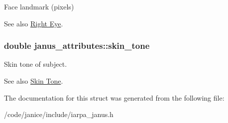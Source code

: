 Face landmark (pixels) 

\begin{DoxySeeAlso}{See also}
\hyperlink{group__janus_right_eye}{Right Eye}. 
\end{DoxySeeAlso}
\hypertarget{structjanus__attributes_adb5a57d3ffd2d48c15daaf417da1a548}{}
\subsubsection[{skin\+\_\+tone}]{\setlength{\rightskip}{0pt plus 5cm}double janus\+\_\+attributes\+::skin\+\_\+tone}\label{structjanus__attributes_adb5a57d3ffd2d48c15daaf417da1a548}


Skin tone of subject. 

\begin{DoxySeeAlso}{See also}
\hyperlink{group__janus_skin_tone}{Skin Tone}. 
\end{DoxySeeAlso}


The documentation for this struct was generated from the following file\+:\begin{DoxyCompactItemize}
\item 
/code/janice/include/iarpa\+\_\+janus.\+h\end{DoxyCompactItemize}
